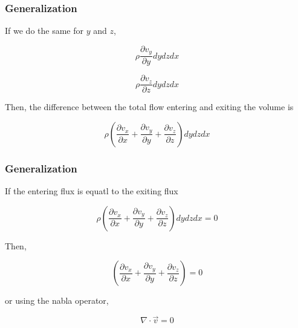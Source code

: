 \documentclass[]{beamer}
\begin{document}
\begin{frame}

\frametitle{Generalization}

If we do the same for $y$ and $z$,

\begin{equation*}
\rho \frac{\partial v_y}{\partial y} dydzdx
\end{equation*}

\begin{equation*}
\rho \frac{\partial v_z}{\partial z} dydzdx
\end{equation*}


Then, the difference between the total flow entering and exiting the volume is

\begin{equation*}
\rho( \frac{\partial v_x}{\partial x}+ \frac{\partial v_y}{\partial y}+ \frac{\partial v_z}{\partial z} )dydzdx
\end{equation*}


 \end{frame}




\begin{frame}

\frametitle{Generalization}

If the entering flux is equatl to the exiting flux


 \begin{equation*}
\rho( \frac{\partial v_x}{\partial x}+ \frac{\partial v_y}{\partial y}+ \frac{\partial v_z}{\partial z} )dydzdx=0
\end{equation*}
\pause

Then,

 \begin{equation*}
( \frac{\partial v_x}{\partial x}+ \frac{\partial v_y}{\partial y}+ \frac{\partial v_z}{\partial z} )=0
\end{equation*}

\pause

or using the nabla operator,


 \begin{equation*}
\nabla \cdot \vec{v}=0
\end{equation*}

 \end{frame}





\end{document}

